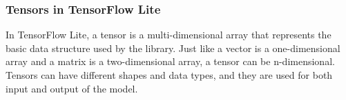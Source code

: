 \subsubsection{Tensors in TensorFlow Lite}
In TensorFlow Lite, a tensor is a multi-dimensional array that represents the basic data structure used by the library. Just like a vector is a one-dimensional array and a matrix is a two-dimensional array, a tensor can be n-dimensional. Tensors can have different shapes and data types, and they are used for both input and output of the model. \cite{tensorflowLiteInference:2024}

